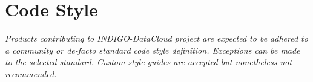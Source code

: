 \section{Code Style}
\footnotesize
\textit{Products contributing to INDIGO-DataCloud project are expected to be adhered to a community or de-facto standard code style definition. Exceptions can be made to the selected standard. Custom style guides are accepted but nonetheless not recommended.}
\\[0.3in]
\normalsize
